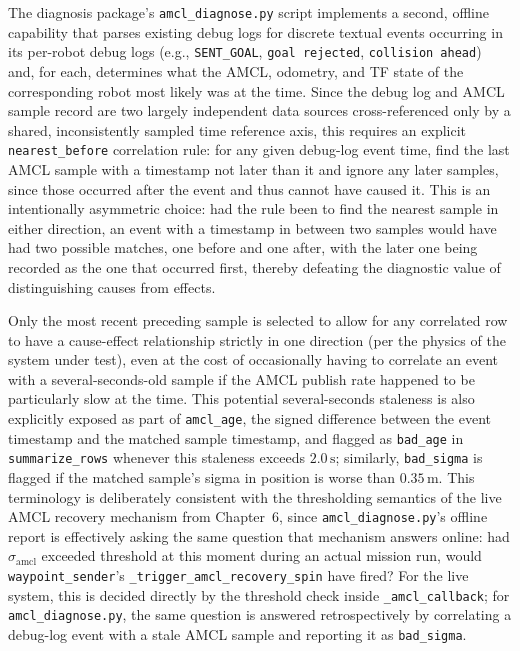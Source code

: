 The diagnosis package's \texttt{amcl\_diagnose.py} script implements a second, offline capability that parses existing debug logs for discrete textual events occurring in its per-robot debug logs (e.g., \texttt{SENT\_GOAL}, \texttt{goal rejected}, \texttt{collision ahead}) and, for each, determines what the AMCL, odometry, and TF state of the corresponding robot most likely was at the time. Since the debug log and AMCL sample record are two largely independent data sources cross-referenced only by a shared, inconsistently sampled time reference axis, this requires an explicit \texttt{nearest\_before} correlation rule: for any given debug-log event time, find the last AMCL sample with a timestamp not later than it and ignore any later samples, since those occurred after the event and thus cannot have caused it. This is an intentionally asymmetric choice: had the rule been to find the nearest sample in either direction, an event with a timestamp in between two samples would have had two possible matches, one before and one after, with the later one being recorded as the one that occurred first, thereby defeating the diagnostic value of distinguishing causes from effects.

Only the most recent preceding sample is selected to allow for any correlated row to have a cause-effect relationship strictly in one direction (per the physics of the system under test), even at the cost of occasionally having to correlate an event with a several-seconds-old sample if the AMCL publish rate happened to be particularly slow at the time. This potential several-seconds staleness is also explicitly exposed as part of \texttt{amcl\_age}, the signed difference between the event timestamp and the matched sample timestamp, and flagged as \texttt{bad\_age} in \texttt{summarize\_rows} whenever this staleness exceeds $2.0\,\text{s}$; similarly, \texttt{bad\_sigma} is flagged if the matched sample's sigma in position is worse than $0.35\,\text{m}$. This terminology is deliberately consistent with the thresholding semantics of the live AMCL recovery mechanism from Chapter~6, since \texttt{amcl\_diagnose.py}'s offline report is effectively asking the same question that mechanism answers online: had $\sigma_{\text{amcl}}$ exceeded threshold at this moment during an actual mission run, would \texttt{waypoint\_sender}'s \texttt{\_trigger\_amcl\_recovery\_spin} have fired? For the live system, this is decided directly by the threshold check inside \texttt{\_amcl\_callback}; for \texttt{amcl\_diagnose.py}, the same question is answered retrospectively by correlating a debug-log event with a stale AMCL sample and reporting it as \texttt{bad\_sigma}.


